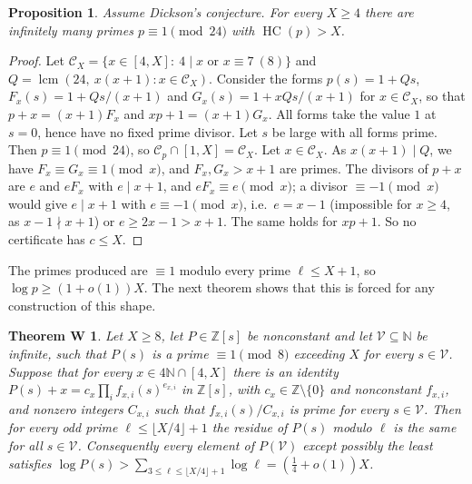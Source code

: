 \documentclass[11pt,reqno]{amsart}
\newtheorem{proposition}[theorem]{Proposition}
\newtheorem*{thmW}{Theorem W}
\theoremstyle{definition}
\newcommand{\Z}{\mathbb Z}
\newcommand{\N}{\mathbb N}
\newcommand{\cC}{\mathcal C}
\newcommand{\HC}{\operatorname{HC}}
\begin{document}
\begin{proposition}\label{prop:dickson}
Assume Dickson's conjecture.  For every $X\ge4$ there are infinitely many
primes $p\equiv1\pmod{24}$ with $\HC(p)>X$.
\end{proposition}

\begin{proof}
Let $\cC_X=\{x\in[4,X]:\ 4\mid x\text{ or }x\equiv7\ (8)\}$ and
$Q=\operatorname{lcm}(24,\ x(x+1):x\in\cC_X)$.  Consider the forms
$p(s)=1+Qs$, $F_x(s)=1+Qs/(x+1)$ and $G_x(s)=1+xQs/(x+1)$ for
$x\in\cC_X$, so that $p+x=(x+1)F_x$ and $xp+1=(x+1)G_x$.  All forms take
the value $1$ at $s=0$, hence have no fixed prime divisor.  Let $s$ be
large with all forms prime.  Then $p\equiv1\pmod{24}$, so
$\cC_p\cap[1,X]=\cC_X$.  Let $x\in\cC_X$.  As $x(x+1)\mid Q$, we have
$F_x\equiv G_x\equiv1\pmod x$, and $F_x,G_x>x+1$ are primes.  The
divisors of $p+x$ are $e$ and $eF_x$ with $e\mid x+1$, and $eF_x\equiv
e\pmod x$; a divisor $\equiv-1\pmod x$ would give $e\mid x+1$ with
$e\equiv-1\pmod x$, i.e.\ $e=x-1$ (impossible for $x\ge4$, as
$x-1\nmid x+1$) or $e\ge2x-1>x+1$.  The same holds for $xp+1$.  So no
certificate has $c\le X$.
\end{proof}

The primes produced are $\equiv1$ modulo every prime $\ell\le X+1$, so
$\log p\ge(1+o(1))X$.  The next theorem shows that this is forced for any
construction of this shape.

\begin{thmW}
Let $X\ge8$, let $P\in\Z[s]$ be nonconstant and let $\mathcal V\subseteq\N$
be infinite, such that $P(s)$ is a prime $\equiv1\pmod 8$ exceeding $X$
for every $s\in\mathcal V$.  Suppose that for every $x\in4\N\cap[4,X]$
there is an identity
$P(s)+x=c_x\prod_if_{x,i}(s)^{e_{x,i}}$ in $\Z[s]$, with $c_x\in\Z\setminus\{0\}$
and nonconstant $f_{x,i}$, and nonzero integers $C_{x,i}$ such that
$f_{x,i}(s)/C_{x,i}$ is prime for every $s\in\mathcal V$.  Then for every
odd prime $\ell\le\lfloor X/4\rfloor+1$ the residue of $P(s)$ modulo $\ell$
is the same for all $s\in\mathcal V$.  Consequently every element of
$P(\mathcal V)$ except possibly the least satisfies
$\log P(s)>\sum_{3\le\ell\le\lfloor X/4\rfloor+1}\log\ell=(\tfrac14+o(1))X$.
\end{thmW}
\end{document}
